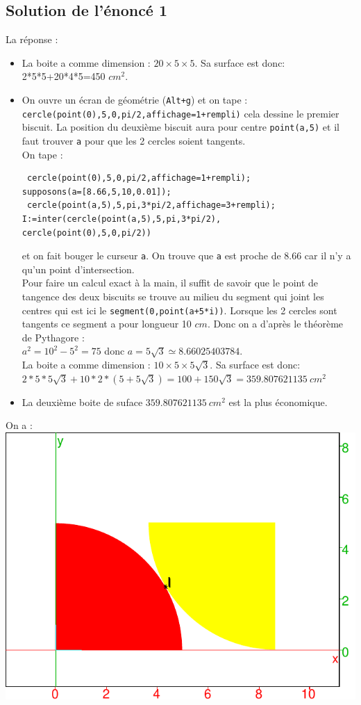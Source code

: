\documentclass[a4paper,11pt]{book}
\begin{document}
\subsection{Solution de l'\'enonc\'e 1}
La r\'eponse :
\begin{itemize}
\item La boite a comme dimension : $20\times 5\times 5$. Sa surface est donc:
2*5*5+20*4*5=450 $cm^2$.
\item On ouvre un \'ecran de g\'eom\'etrie ({\tt Alt+g}) et on tape :
{\tt cercle(point(0),5,0,pi/2,affichage=1+rempli)}
cela dessine le premier biscuit. La position du deuxi\`eme biscuit aura  pour 
centre {\tt point(a,5)} et il faut trouver {\tt a} pour que les 2  
cercles soient tangents.\\
On tape :
\begin{verbatim}
 cercle(point(0),5,0,pi/2,affichage=1+rempli);
supposons(a=[8.66,5,10,0.01]);
 cercle(point(a,5),5,pi,3*pi/2,affichage=3+rempli);
I:=inter(cercle(point(a,5),5,pi,3*pi/2),
cercle(point(0),5,0,pi/2))
\end{verbatim}
et on fait bouger le curseur {\tt a}. On trouve que 
{\tt a} est proche de 8.66 car il n'y a qu'un point d'intersection.\\
Pour faire un calcul exact \`a la main, il suffit de savoir que le point de 
tangence des deux biscuits se trouve au milieu du segment qui joint les centres
 qui est ici le {\tt segment(0,point(a+5*i))}. Lorsque les 2 cercles sont 
tangents ce segment a pour longueur 10 $cm$. Donc on a d'apr\`es le 
th\'eor\`eme de Pythagore :\\
$a^2=10^2-5^2=75$ donc $a=5\sqrt 3 \simeq 8.66025403784$.\\
La boite a comme dimension : $10\times 5\times 5\sqrt 3$. Sa surface est donc:
$2*5*5\sqrt 3+10*2*(5+ 5\sqrt 3)=100+150\sqrt 3=359.807621135\ cm^2$
\item La deuxi\`eme boite de suface $359.807621135\ cm^2$ est la plus 
\'economique.
\end{itemize}
On a :\\
\includegraphics[width=\textwidth]{biscuit2}
\end{document}
